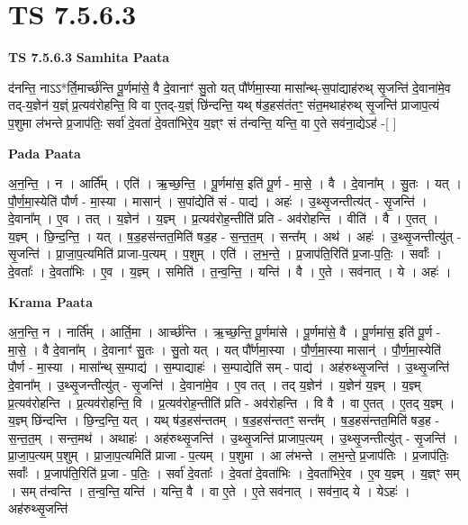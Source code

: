 \documentclass[17pt]{extarticle}
\begin{document}
\section{ TS 7.5.6.3 }

\textbf{TS 7.5.6.3 } \newline
\textbf{Samhita Paata} \newline

द॑नन्ति॒ नाऽऽ*र्ति॒मार्च्छ॑न्ति पू॒र्णमा॑से॒ वै दे॒वानाꣳ॑ सु॒तो यत् पौ᳚र्णमा॒स्या मासा᳚न्थ्-स॒पांद्याह॑रुथ् सृ॒जन्ति॑ दे॒वाना॑मे॒व तद्-य॒ज्ञेन॑ य॒ज्ञ्ं प्र॒त्यव॑रोहन्ति॒ वि वा ए॒तद्-य॒ज्ञ्ं छि॑न्दन्ति॒ यथ् ष॑ड॒हस॑तंतꣳ॒॒ संत॒मथाह॑रुथ् सृ॒जन्ति॑ प्राजाप॒त्यं प॒शुमा ल॑भन्ते प्र॒जाप॑तिः॒ सर्वा॑ दे॒वता॑ दे॒वता॑भिरे॒व य॒ज्ञ्ꣳ सं त॑न्वन्ति॒ यन्ति॒ वा ए॒ते सव॑ना॒द्येऽह॑ -[  ] \newline

\textbf{Pada Paata} \newline

अ॒न॒न्ति॒ । न । आर्ति᳚म् । एति॑ । ऋ॒च्छ॒न्ति॒ । पू॒र्णमा॑स॒ इति॑ पू॒र्ण - मा॒से॒ । वै । दे॒वाना᳚म् । सु॒तः । यत् । पौ॒र्ण॒मा॒स्येति॑ पौर्ण - मा॒स्या । मासान्॑ । स॒पांद्येति॑ सं - पाद्य॑ । अहः॑ । उ॒थ्सृ॒जन्तीत्य॑त् - सृ॒जन्ति॑ । दे॒वाना᳚म् । ए॒व । तत् । य॒ज्ञेन॑ । य॒ज्ञ्म् । प्र॒त्यव॑रोह॒न्तीति॑ प्रति - अव॑रोहन्ति । वीति॑ । वै । ए॒तत् । य॒ज्ञ्म् । छि॒न्द॒न्ति॒ । यत् । ष॒ड॒हस॑न्तत॒मिति॑ षड॒ह - स॒न्त॒त॒म् । सन्त᳚म् । अथ॑ । अहः॑ । उ॒थ्सृ॒जन्तीत्यु॑त् - सृ॒जन्ति॑ । प्रा॒जा॒प॒त्यमिति॑ प्राजा-प॒त्यम् । प॒शुम् । एति॑ । ल॒भ॒न्ते॒ । प्र॒जाप॑ति॒रिति॑ प्र॒जा-प॒तिः॒ । सर्वाः᳚ । दे॒वताः᳚ । दे॒वता॑भिः । ए॒व । य॒ज्ञ्म् । समिति॑ । त॒न्व॒न्ति॒ । यन्ति॑ । वै । ए॒ते । सव॑नात् । ये । अहः॑ ।  \newline


\textbf{Krama Paata} \newline

अ॒न॒न्ति॒ न । नार्ति᳚म् । आर्ति॒मा । आर्च्छ॑न्ति । ऋ॒च्छ॒न्ति॒ पू॒र्णमा॑से । पू॒र्णमा॑से॒ वै । पू॒र्णमा॑स॒ इति॑ पू॒र्ण - मा॒से॒ । वै दे॒वाना᳚म् । दे॒वानाꣳ॑ सु॒तः । सु॒तो यत् । यत् पौ᳚र्णमा॒स्या । पौ॒र्ण॒मा॒स्या मासान्॑ । पौ॒र्ण॒मा॒स्येति॑ पौर्ण - मा॒स्या । मासा᳚न्थ् स॒म्पाद्य॑ । स॒म्पाद्याहः॑ । स॒म्पाद्येति॑ सम् - पाद्य॑ । अह॑रुथ्सृ॒जन्ति॑ । उ॒थ्सृ॒जन्ति॑ दे॒वाना᳚म् । उ॒थ्सृ॒जन्तीत्यु॑त् - सृ॒जन्ति॑ । दे॒वाना॑मे॒व । ए॒व तत् । तद् य॒ज्ञेन॑ । य॒ज्ञेन॑ य॒ज्ञ्म् । य॒ज्ञ्म् प्र॒त्यव॑रोहन्ति । प्र॒त्यव॑रोहन्ति॒ वि । प्र॒त्यव॑रोह॒न्तीति॑ प्रति - अव॑रोहन्ति । वि वै । वा ए॒तत् । ए॒तद् य॒ज्ञ्म् । य॒ज्ञ्म् छि॑न्दन्ति । छि॒न्द॒न्ति॒ यत् । यथ् ष॑ड॒हस॑न्ततम् । ष॒ड॒हस॑न्ततꣳ॒॒ सन्त᳚म् । ष॒ड॒हस॑न्तत॒मिति॑ षड॒ह - स॒न्त॒त॒म् । सन्त॒मथ॑ । अथाहः॑ । अह॑रुथ्सृ॒जन्ति॑ । उ॒थ्सृ॒जन्ति॑ प्राजाप॒त्यम् । उ॒थ्सृ॒जन्तीत्यु॑त् - सृ॒जन्ति॑ । प्रा॒जा॒प॒त्यम् प॒शुम् । प्रा॒जा॒प॒त्यमिति॑ प्राजा - प॒त्यम् । प॒शुमा । आ ल॑भन्ते । ल॒भ॒न्ते॒ प्र॒जाप॑तिः । प्र॒जाप॑तिः॒ सर्वाः᳚ । प्र॒जाप॑ति॒रिति॑ प्र॒जा - प॒तिः॒ । सर्वा॑ दे॒वताः᳚ । दे॒वता॑ दे॒वता॑भिः । दे॒वता॑भिरे॒व । ए॒व य॒ज्ञ्म् । य॒ज्ञ्ꣳ सम् । सम् त॑न्वन्ति । त॒न्व॒न्ति॒ यन्ति॑ । यन्ति॒ वै । वा ए॒ते । ए॒ते सव॑नात् । सव॑ना॒द् ये । येऽहः॑ । अह॑रुथ्सृ॒जन्ति॑ \newline
\end{document}
